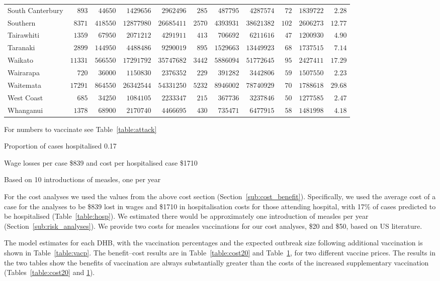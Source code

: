 \documentclass{article}
\begin{document}
\begin{itemize}
\begin{table}
\begin{center}
\begin{tabular}{lrrrrrrrrrr}
South Canterbury&$  893$&$ 44650$&$ 1429656$&$ 2962496$&$ 285$&$ 487795$&$ 4287574$&$ 72$&$1839722$&$ 2.28$\tabularnewline
Southern&$ 8371$&$418550$&$12877980$&$26685411$&$2570$&$4393931$&$38621382$&$102$&$2606273$&$12.77$\tabularnewline
Tairawhiti&$ 1359$&$ 67950$&$ 2071212$&$ 4291911$&$ 413$&$ 706692$&$ 6211616$&$ 47$&$1200930$&$ 4.90$\tabularnewline
Taranaki&$ 2899$&$144950$&$ 4488486$&$ 9290019$&$ 895$&$1529663$&$13449923$&$ 68$&$1737515$&$ 7.14$\tabularnewline
Waikato&$11331$&$566550$&$17291792$&$35747682$&$3442$&$5886094$&$51772645$&$ 95$&$2427411$&$17.29$\tabularnewline
Wairarapa&$  720$&$ 36000$&$ 1150830$&$ 2376352$&$ 229$&$ 391282$&$ 3442806$&$ 59$&$1507550$&$ 2.23$\tabularnewline
Waitemata&$17291$&$864550$&$26342544$&$54331250$&$5232$&$8946002$&$78740929$&$ 70$&$1788618$&$29.68$\tabularnewline
West Coast&$  685$&$ 34250$&$ 1084105$&$ 2233347$&$ 215$&$ 367736$&$ 3237846$&$ 50$&$1277585$&$ 2.47$\tabularnewline
Whanganui&$ 1378$&$ 68900$&$ 2170740$&$ 4466695$&$ 430$&$ 735471$&$ 6477915$&$ 58$&$1481998$&$ 4.18$\tabularnewline
\hline
\end{tabular}\end{center}\label{table:cost50}
\begin{tablenotes}\footnotesize  
        \item For numbers to vaccinate see Table~\ref{table:attack}
        \item Proportion of cases hospitalised 0.17
        \item Wage losses per case \$839 and cost per hospitalised case \$1710
        \item Based on 10 introductions of measles, one per year
      \end{tablenotes}  
\end{table}


For the cost analyses we used the values from the above cost section (Section~\ref{sub:cost_benefit}). Specifically, we used the average cost of a case for the analyses to be \$839 lost in wages and \$1710 in hospitalisation costs for those attending hospital, with 17\% of cases predicted to be hospitalised (Table~\ref{table:hosp}). We estimated there would be approximately one introduction of measles per year (Section~\ref{sub:risk_analyses}). We provide two costs for measles vaccinations for our cost analyses, \$20 and \$50, based on US literature.

The model estimates for each DHB, with the vaccination percentages and the expected outbreak size following additional vaccination is shown in Table~\ref{table:vacp}. The benefit--cost results are in Table~\ref{table:cost20} and Table~\ref{table:cost50}, for two different vaccine prices. The results in the two tables show the benefits of vaccination are always substantially greater than the costs of the increased supplementary vaccination (Tables~\ref{table:cost20} and \ref{table:cost50}).


\end{itemize}
\end{document}
